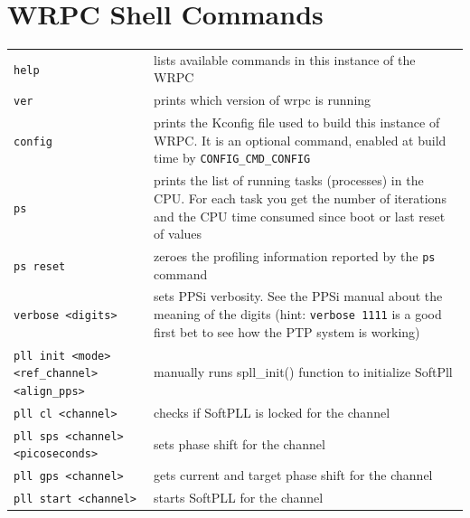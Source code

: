 \documentclass[a4paper, 12pt]{article}
\newcommand{\code}[1]{\texttt{#1}}
\begin{document}


\appendix
\clearpage
\section{WRPC Shell Commands}
\label{WRPC Shell commands}

\footnotesize
\renewcommand\arraystretch{1.5}
\begin{longtable}{  p{7.5cm}  p{7cm} }

  \code{help} & lists available commands in this instance of the WRPC \\

  \code{ver} & prints which version of wrpc is running \\

  \code{config} & prints the Kconfig file used to build this instance of
WRPC. It is an optional command, enabled at build time by
\texttt{CONFIG\_CMD\_CONFIG} \\

  \code{ps} & prints the list of running tasks (processes) in the CPU.
For each task you get the number of iterations and the CPU time consumed
since boot or last reset of values\\

  \code{ps reset} & zeroes the profiling information reported by
the \code{ps} command\\

  \code{verbose <digits>} & sets PPSi verbosity. See the PPSi manual
about the meaning of the digits (hint: \texttt{verbose 1111} is a good first bet to
see how the PTP system is working) \\

  \code{pll init <mode> <ref\_channel> <align\_pps>} & manually runs
spll\_init() function to initialize SoftPll \\

  \code{pll cl <channel>} & checks if SoftPLL is locked for the channel\\

  \code{pll sps <channel> <picoseconds>} & sets phase shift for the channel\\

  \code{pll gps <channel>} & gets current and target phase shift for the channel\\

  \code{pll start <channel>} & starts SoftPLL for the channel\\


\end{longtable}
\end{document}
